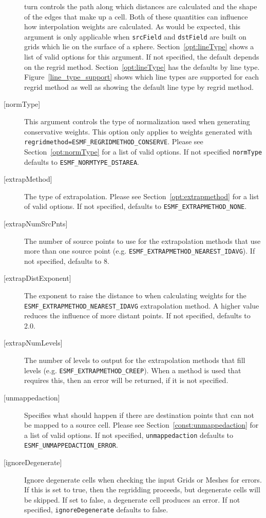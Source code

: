 \begin{description}
   turn controls the path along which distances are calculated and the shape of the edges that make
   up a cell. Both of these quantities can influence how interpolation weights are calculated.
   As would be expected, this argument is only applicable when {\tt srcField} and {\tt dstField} are
   built on grids which lie on the surface of a sphere. Section~\ref{opt:lineType} shows a
   list of valid options for this argument. If not specified, the default depends on the
   regrid method. Section~\ref{opt:lineType} has the defaults by line type. Figure~\ref{line_type_support} shows
   which line types are supported for each regrid method as well as showing the default line type by regrid method.
   \item [{[normType]}]
   This argument controls the type of normalization used when generating conservative weights. This option
   only applies to weights generated with {\tt regridmethod=ESMF\_REGRIDMETHOD\_CONSERVE}. Please see
   Section~\ref{opt:normType} for a
   list of valid options. If not specified {\tt normType} defaults to {\tt ESMF\_NORMTYPE\_DSTAREA}.
   \item [{[extrapMethod]}]
   The type of extrapolation. Please see Section~\ref{opt:extrapmethod}
   for a list of valid options. If not specified, defaults to
   {\tt ESMF\_EXTRAPMETHOD\_NONE}.
   \item [{[extrapNumSrcPnts]}]
   The number of source points to use for the extrapolation methods that use more than one source point
   (e.g. {\tt ESMF\_EXTRAPMETHOD\_NEAREST\_IDAVG}). If not specified, defaults to 8.
   \item [{[extrapDistExponent]}]
   The exponent to raise the distance to when calculating weights for
   the {\tt ESMF\_EXTRAPMETHOD\_NEAREST\_IDAVG} extrapolation method. A higher value reduces the influence
   of more distant points. If not specified, defaults to 2.0.
   \item [{[extrapNumLevels]}]
   The number of levels to output for the extrapolation methods that fill levels
   (e.g. {\tt ESMF\_EXTRAPMETHOD\_CREEP}). When a method is used that requires this, then an error will be returned, if it
   is not specified.
   \item [{[unmappedaction]}]
   Specifies what should happen if there are destination points that
   can not be mapped to a source cell. Please see Section~\ref{const:unmappedaction} for a
   list of valid options. If not specified, {\tt unmappedaction} defaults to {\tt ESMF\_UNMAPPEDACTION\_ERROR}.
   \item [{[ignoreDegenerate]}]
   Ignore degenerate cells when checking the input Grids or Meshes for errors. If this is set to true, then the
   regridding proceeds, but degenerate cells will be skipped. If set to false, a degenerate cell produces an error.
   If not specified, {\tt ignoreDegenerate} defaults to false.
  

\end{description}
